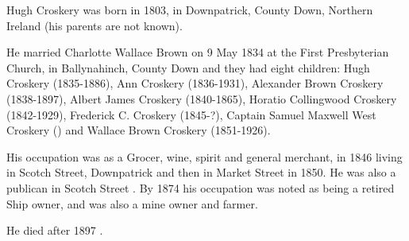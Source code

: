
Hugh Croskery was born in 1803, in Downpatrick, County Down, Northern Ireland (his parents are not known).

He married Charlotte Wallace Brown on 9 May 1834 at the First Presbyterian Church, in Ballynahinch, County Down and they had eight children:  Hugh Croskery (1835-1886), Ann Croskery (1836-1931), Alexander Brown Croskery (1838-1897), Albert James Croskery (1840-1865), Horatio Collingwood Croskery (1842-1929), Frederick C. Croskery (1845-?),  Captain Samuel Maxwell West Croskery () and Wallace Brown Croskery (1851-1926). 

His occupation was as a Grocer, wine, spirit and general merchant, in 1846 living in Scotch Street, Downpatrick and then in Market Street in 1850.  He was also a publican in Scotch Street \cite{HughCroskeryOccupation}. By 1874 his occupation was noted as being a retired Ship owner, and was also a mine owner and farmer. 

He died after 1897 \cite{HughCroskeryDeath}.

